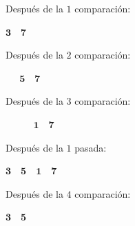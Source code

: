 \documentclass[ebook,oneside]{memoir}
\newcommand{\bolds}[1]{\boldsymbol{#1}}
\begin{document}
        \begin{minipage}{.6\textwidth}
        Despu\'{e}s de la $1$ comparaci\'{o}n:
        \end{minipage}\hfill
        \begin{minipage}{.3\textwidth}
        $\bolds{3\quad 7}$
        \end{minipage}

        \vspace*{-0.1cm}

        \begin{minipage}{.6\textwidth}
        Despu\'{e}s de la $2$ comparaci\'{o}n:
        \end{minipage}\hfill
        \begin{minipage}{.3\textwidth}
        $\bolds{\quad\;\, 5\quad 7}$
        \end{minipage}

        \vspace*{-0.1cm}

        \begin{minipage}{.6\textwidth}
        Despu\'{e}s de la $3$ comparaci\'{o}n:
        \end{minipage}\hfill
        \begin{minipage}{.3\textwidth}
        $\bolds{\quad\;\, \quad\;\, 1\quad 7}$
        \end{minipage}

        \vspace*{-0.1cm}

        \begin{minipage}{.6\textwidth}
        Despu\'{e}s de la $1$ pasada:
        \end{minipage}\hfill
        \begin{minipage}{.3\textwidth}
        $\bolds{3\quad 5\quad 1\quad 7}$
        \end{minipage}

        \vspace*{0.2cm}

        \begin{minipage}{.6\textwidth}
        Despu\'{e}s de la $4$ comparaci\'{o}n:
        \end{minipage}\hfill
        \begin{minipage}{.3\textwidth}
        $\bolds{3\quad 5}$
        \end{minipage}
\end{document}
